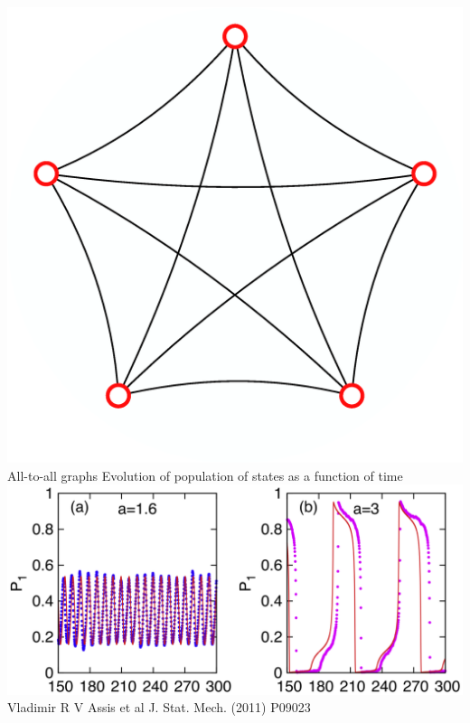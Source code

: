 \documentclass[serif,mathserif]{beamer}
\begin{document}
\begin{frame}{\includegraphics[height=0.06\textheight]{ring-complete-thumb.eps}\hspace{0.25cm} All-to-all graphs}
    \centering
    Evolution of population of states as a function of time\\
    \vspace{0.4cm}
    \includegraphics[height=0.6\textheight]{pop-evolution.eps}\\
    Vladimir R V Assis et al J. Stat. Mech. (2011) P09023
\end{frame}
\end{document}
